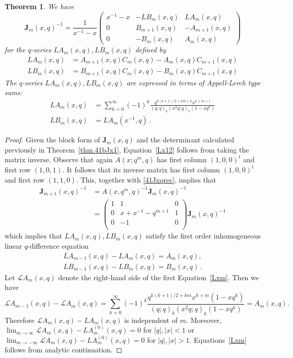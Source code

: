 \documentclass[12pt,reqno]{amsart}
\newtheorem{theorem}{Theorem}
\theoremstyle{definition}
\def\calL{\mathcal L}
\def\be{\begin{equation}}
\def\ee{\end{equation}}
\def\bJ{\mathbf J}
\begin{document}
\begin{theorem}
\label{thm.41bJx2}  
We have
\be
\label{Jxqinv}
\bJ_{m}(x,q)^{-1}
=
\frac{1}{x^{-1}-x}\begin{pmatrix}
x^{-1}-x  & -LB_{m}(x,q) & LA_{m}(x,q)\\
0 & B_{m+1}(x,q) & -A_{m+1}(x,q)\\
0 & -B_{m}(x,q) & A_{m}(x,q)
\end{pmatrix} 
\ee
for the $q$-series $LA_m(x,q),LB_m(x,q)$ defined by
\be
\label{Lx12}
\begin{aligned}
LA_{m}(x,q) &=
A_{m+1}(x,q)C_{m}(x,q)-A_{m}(x,q)C_{m+1}(x,q)
\\
LB_{m}(x,q) &=
B_{m+1}(x,q)C_{m}(x,q)-B_{m}(x,q)C_{m+1}(x,q)
\end{aligned}
\ee
The $q$-series $LA_m(x,q),LB_m(x,q)$ are expressed in terms of Appell-Lerch type sums:
\be
\label{Lxm}
\begin{aligned} 
LA_{m}(x,q) &=
\sum_{k=0}^{\infty}(-1)^{k}
\frac{q^{k(k+1)/2+km+k}x^{k+m+1}}{(q;q)_{k}(x^{2}q;q)_{k}(1-xq^{k})} \\      
LB_{m}(x,q) &=
LA_{m}(x^{-1},q) \,.
\end{aligned}
\ee
\end{theorem}
\begin{proof}
  Given the block form of $\bJ_{m}(x,q)$ and the determinant calculated previously in
  Theorem~\ref{thm.41bJx1}, Equation~\eqref{Lx12} follows from taking the matrix inverse.
Observe
that again $A(x;q^m,q)$ has first column $(1,0,0)^t$ and
first row $(1,0,1)$. It follows that its inverse matrix has first column $(1,0,0)^t$
and first row $(1,1,0)$. This, together with \eqref{41Jxqrec}, implies that
\begin{equation}
\begin{split}
\bJ_{m+1}(x,q)^{-1}
&= A(x,q^m,q)^{-1}
\bJ_{m}(x,q)^{-1}\\
&=
\begin{pmatrix}
1 & 1 & 0\\
0 & x+x^{-1}-q^{m+1} & 1\\
0 & -1 & 0\\
\end{pmatrix}
\bJ_{m}(x,q)^{-1}
\end{split}
\end{equation}
which implies that $LA_m(x,q),LB_{m}(x,q)$ satisfy the first order inhomogeneous linear
$q$-difference equation
\begin{equation}
\begin{split}
LA_{m-1}(x,q)-LA_{m}(x,q) =
A_{m}(x,q),\\
LB_{m-1}(x,q)-LB_{m}(x,q) =
B_{m}(x,q)\,.
\end{split}
\end{equation}
Let $\calL A_m(x,q)$ denote the right-hand side of the first Equation~\eqref{Lxm}.  
Then we have
\[
\calL A_{m-1}(x,q)-\calL A_{m}(x,q)
=
\sum_{k=0}^{\infty}(-1)^{k}
\frac{q^{k(k+1)/2+km}x^{k+m}(1-xq^{k})}{(q;q)_{k}(x^{2}q;q)_{k}(1-xq^{k})}
=
A_{m}(x,q).
\]
Therefore $\calL A_{m}(x,q)-LA_{m}(x,q)$ is independent of $m$. Moreover,
$\lim_{m \to \infty} \calL A_{m}(x,q)-LA_{m}^{(0)}(x,q)=0$ for $|q|,|x|<1$ or
$\lim_{m \to -\infty} \calL A_{m}(x,q)-LA_{m}^{(0)}(x,q)=0$ for $|q|,|x|>1$.
Equations~\eqref{Lxm} follows from analytic continuation.
\end{proof}
\end{document}
